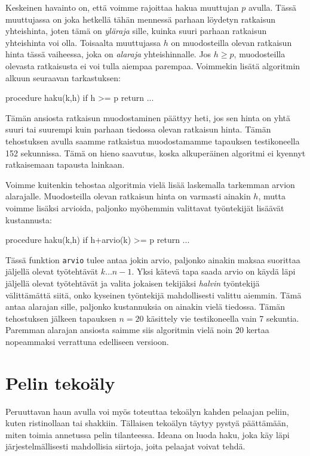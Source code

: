Keskeinen havainto on, että voimme rajoittaa hakua muuttujan
$p$ avulla. Tässä muuttujassa on joka hetkellä
tähän mennessä parhaan löydetyn ratkaisun yhteishinta,
joten tämä on \emph{yläraja} sille, kuinka suuri parhaan ratkaisun
yhteishinta voi olla.
Toisaalta muuttujassa $h$ on muodosteilla olevan ratkaisun
hinta tässä vaiheessa, joka on \emph{alaraja} yhteishinnalle.
Jos $h \ge p$, muodosteilla olevasta ratkaisusta ei
voi tulla aiempaa parempaa. Voimmekin lisätä algoritmin alkuun
seuraavan tarkastuksen:

\begin{code}
procedure haku(k,h)
    if h >= p
        return
    ...
\end{code}

Tämän ansiosta ratkaisun muodostaminen päättyy heti,
jos sen hinta on yhtä suuri tai suurempi kuin parhaan
tiedossa olevan ratkaisun hinta.
Tämän tehostuksen avulla saamme ratkaistua
muodostamamme tapauksen testikoneella 152 sekunnissa.
Tämä on hieno saavutus, koska alkuperäinen algoritmi
ei kyennyt ratkaisemaan tapausta lainkaan.

Voimme kuitenkin tehostaa algoritmia vielä lisää
laskemalla tarkemman arvion alarajalle.
Muodosteilla olevan ratkaisun hinta on varmasti ainakin $h$,
mutta voimme lisäksi arvioida, paljonko myöhemmin valittavat
työntekijät lisäävät kustannusta:

\begin{code}
procedure haku(k,h)
    if h+arvio(k) >= p
        return
    ...
\end{code}

Tässä funktion \texttt{arvio} tulee antaa jokin arvio,
paljonko ainakin maksaa suorittaa jäljellä olevat työtehtävät $k \dots n-1$.
Yksi kätevä tapa saada arvio on käydä läpi jäljellä olevat
työtehtävät ja valita jokaisen tekijäksi \emph{halvin} työntekijä välittämättä
siitä, onko kyseinen työntekijä mahdollisesti valittu aiemmin.
Tämä antaa alarajan sille, paljonko kustannuksia on ainakin vielä tiedossa.
Tämän tehostuksen jälkeen tapauksen $n=20$ käsittely vie
testikoneella vain 7 sekuntia.
Paremman alarajan ansiosta saimme siis algoritmin
vielä noin 20 kertaa nopeammaksi verrattuna edelliseen versioon.

\section{Pelin tekoäly}

Peruuttavan haun avulla voi myös toteuttaa tekoälyn kahden pelaajan peliin,
kuten ristinollaan tai shakkiin.
Tällaisen tekoälyn täytyy pystyä päättämään,
miten toimia annetussa pelin tilanteessa.
Ideana on luoda haku, joka käy läpi
järjestelmällisesti mahdollisia siirtoja,
joita pelaajat voivat tehdä.

